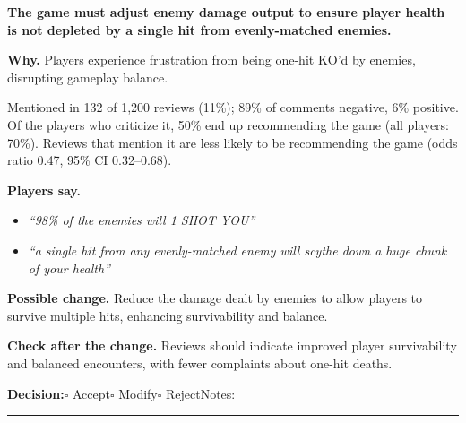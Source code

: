 \documentclass[10pt]{article}
\begin{document}
\begin{tcolorbox}[colback=white,colframe=gR,colbacktitle=lR,coltitle=black,title={\textbf{R3}\quad Enemy Strength and Balance\hfill\textcolor{gR}{\textbf{Repair first}}},boxrule=0.8pt,arc=2pt,left=6pt,right=6pt,top=4pt,bottom=4pt,before skip=8pt,after skip=8pt]
{\large\textbf{The game must adjust enemy damage output to ensure player health is not depleted by a single hit from evenly-matched enemies.}}

\smallskip
\textbf{Why.} Players experience frustration from being one-hit KO'd by enemies, disrupting gameplay balance.

\smallskip
{\small Mentioned in 132 of 1,200 reviews (11\%); 89\% of comments negative, 6\% positive. Of the players who criticize it, 50\% end up recommending the game (all players: 70\%). Reviews that mention it are less likely to be recommending the game {\color{ink2}\footnotesize(odds ratio 0.47, 95\% CI 0.32--0.68)}.}

\smallskip
\textbf{Players say.}
\begin{itemize}[leftmargin=12pt,itemsep=1pt,topsep=2pt]
    \item \textit{``98\% of the enemies will 1 SHOT YOU''}
    \item \textit{``a single hit from any evenly-matched enemy will scythe down a huge chunk of your health''}
\end{itemize}
\textbf{Possible change.} Reduce the damage dealt by enemies to allow players to survive multiple hits, enhancing survivability and balance.

\smallskip
\textbf{Check after the change.} Reviews should indicate improved player survivability and balanced encounters, with fewer complaints about one-hit deaths.

\medskip
{\small\textbf{Decision:}\quad $\square$ Accept\quad $\square$ Modify\quad $\square$ Reject\qquad Notes: \rule{0.38\linewidth}{0.4pt}}
\end{tcolorbox}
\end{document}
